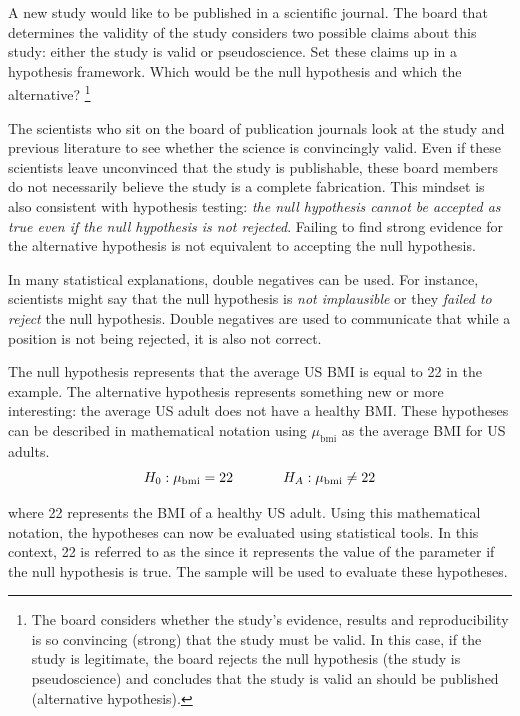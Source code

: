 \begin{exercise} \label{hypTestStudyExample}
A new study would like to be published in a scientific journal. The board that determines the validity of the study considers two possible claims about this study: either the study is valid or pseudoscience. Set these claims up in a hypothesis framework. Which would be the null hypothesis and which the alternative? \footnote{The board considers whether the study's evidence, results and reproducibility is so convincing (strong) that the study must be valid. In this case, if the study is legitimate, the board rejects the null hypothesis (the study is pseudoscience) and concludes that the study is valid an should be published (alternative hypothesis).}
\end{exercise}

The scientists who sit on the board of publication journals look at the study and previous literature to see whether the science is convincingly valid. Even if these scientists leave unconvinced that the study is publishable, these board members do not necessarily believe the study is a complete fabrication. This mindset is also consistent with hypothesis testing: \emph{the null hypothesis cannot be accepted as true even if the null hypothesis is not rejected}. Failing to find strong evidence for the alternative hypothesis is not equivalent to accepting the null hypothesis.

\begin{tipBox}{
In many statistical explanations, double negatives can be used. For instance, scientists might say that the null hypothesis is \emph{not implausible} or they \emph{failed to reject} the null hypothesis. Double negatives are used to communicate that while a position is not being rejected, it is also not correct.}
\end{tipBox}

The null hypothesis represents that the average US BMI is equal to 22 in the  example. The alternative hypothesis represents something new or more interesting: the average US adult does not have a healthy BMI. These hypotheses can be described in mathematical notation using $\mu_{\mathrm{bmi}}$ as the average BMI for US adults.
\[H_0:\mu_{\mathrm{bmi}} = 22 \hspace{0.5in} H_A: \mu_{\mathrm{bmi}} \neq 22\]

where 22 represents the BMI of a healthy US adult. Using this mathematical notation, the hypotheses can now be evaluated using statistical tools. In this context, 22 is referred to as the  since it represents the value of the parameter if the null hypothesis is true. The  sample will be used to evaluate these hypotheses. 

